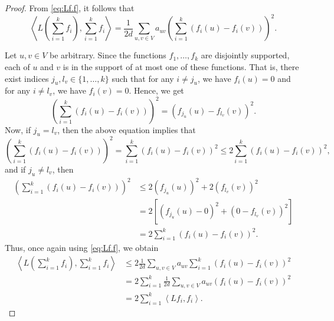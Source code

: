 \documentclass[12pt,a4paper,bold]{thesis}
\theoremstyle{definition}
\newcommand*{\ip}[2]{\left\langle #1 , #2 \right\rangle}
\begin{document}
\begin{proof}
    From \cref{eq:Lf.f}, it follows that
    \begin{equation*}
        \ip{L\left(\sum_{i=1}^{k} f_i\right)}{\sum_{i=1}^{k} f_i} 
        = \frac{1}{2d} \sum_{u,v \in V} a_{uv} \left(\sum_{i=1}^{k}(f_i(u) - f_i(v))\right)^2.
    \end{equation*}
    
    Let $u, v \in V$ be arbitrary. Since the functions $f_1, \dots, f_k$ are 
    disjointly supported, each of $u$ and $v$ is in the support of at most
    one of these functions. That is, there exist indices $j_u, l_v \in \{1, \dots, k\}$
    such that for any $i \neq j_u$, we have $f_i(u) = 0$ and for any $i \neq l_v$,
    we have $f_i(v) = 0$. Hence, we get
    \begin{equation*}
        \left(\sum_{i=1}^{k}(f_i(u) - f_i(v))\right)^2 = (f_{j_u}(u) - f_{l_v}(v))^2.
    \end{equation*}
    Now, if $j_u = l_v$, then the above equation implies that
    \begin{equation*}
        \left(\sum_{i=1}^{k}(f_i(u) - f_i(v))\right)^2 = \sum_{i=1}^{k} (f_i(u) - f_i(v))^2
        \leq 2 \sum_{i=1}^{k} (f_i(u) - f_i(v))^2,
    \end{equation*}
    and if $j_u \neq l_v$, then
    \begin{align*}
        \left(\sum_{i=1}^{k}(f_i(u) - f_i(v))\right)^2 
        & \leq 
        2(f_{j_u}(u))^2 + 2(f_{l_v}(v))^2
        \\
        & = 
        2 [(f_{j_u}(u) - 0)^2 + (0 - f_{l_v}(v))^2]
        \\
        & =
        2 \sum_{i = 1}^{k} (f_i(u) - f_i(v))^2.
    \end{align*}
    Thus, once again using \cref{eq:Lf.f}, we obtain
    \begin{align*}
        \ip{L\left(\sum_{i=1}^{k} f_i\right)}{\sum_{i=1}^{k} f_i} 
        & \leq 
        2 \frac{1}{2d} \sum_{u,v \in V} a_{uv} \sum_{i=1}^{k} (f_i(u) - f_i(v))^2
        \\
        & = 
        2 \sum_{i=1}^{k} \frac{1}{2d} \sum_{u,v \in V} a_{uv} (f_i(u) - f_i(v))^2
        \\
        & =
        2 \sum_{i=1}^{k} \ip{Lf_i}{f_i}.
    \end{align*}
    

\end{proof}
\end{document}
